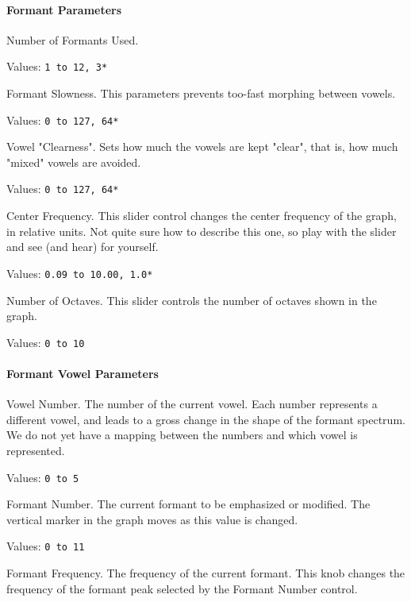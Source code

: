 \paragraph{Formant Parameters}
\label{paragraph:formant_parameters}

   Number of Formants Used.

   Values:  \texttt{1 to 12, 3*}

   Formant Slowness.
   This parameters prevents too-fast morphing between vowels.

   Values:  \texttt{0 to 127, 64*}

   Vowel "Clearness".
   Sets how much the vowels are kept "clear",
   that is, how much "mixed" vowels are avoided.

   Values:  \texttt{0 to 127, 64*}

   Center Frequency.
   This slider control changes the center frequency of the graph, in relative
   units.  Not quite sure how to describe this one, so play with the slider and
   see (and hear) for yourself.

   Values:  \texttt{0.09 to 10.00, 1.0*}

   Number of Octaves.
   This slider controls the number of octaves shown in the graph.

   Values:  \texttt{0 to 10}

\paragraph{Formant Vowel Parameters}
\label{paragraph:formant_vowel_parameters}

   Vowel Number.
   The number of the current vowel.
   Each number represents a different vowel, and leads to a gross change in the
   shape of the formant spectrum.
   We do not yet have a mapping between the numbers and which vowel is
   represented.

   Values:  \texttt{0 to 5}

   Formant Number.
   The current formant to be emphasized or modified.  The vertical marker in
   the graph moves as this value is changed.

   Values:  \texttt{0 to 11}

   Formant Frequency.
   The frequency of the current formant.
   This knob changes the frequency of the formant peak selected by the 
   Formant Number control.

